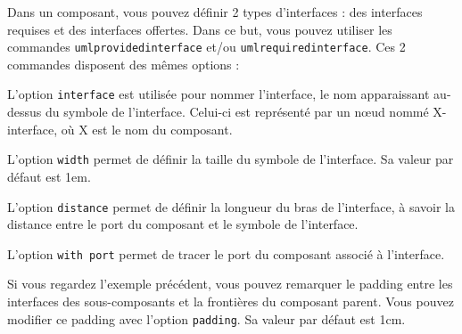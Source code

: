 \documentclass[a4paper,11pt]{report}
\newcommand{\inputTikZ}[1]{%
  }%
\newcommand{\inputTikZ}[1]{%
    \texttt{[image: fig/\#1.pdf]}%
  }%
\begin{document}
Dans un composant, vous pouvez définir 2 types d'interfaces : des interfaces requises et des interfaces offertes. Dans ce but, vous pouvez utiliser les commandes {\tt umlprovidedinterface} et/ou {\tt umlrequiredinterface}.
Ces 2 commandes disposent des mêmes options :

\medskip

\begin{minipage}{0.45\textwidth}

\end{minipage}
\begin{minipage}{0.55\textwidth}
\begin{center}
\inputTikZ{componentinterface}
\end{center}
\end{minipage}

\medskip

L'option {\tt interface} est utilisée pour nommer l'interface, le nom apparaissant au-dessus du symbole de l'interface.
Celui-ci est représenté par un n\oe{}ud nommé X-interface, où X est le nom du composant.

\medskip

L'option {\tt width} permet de définir la taille du symbole de l'interface. Sa valeur par défaut est 1em.

\medskip

L'option {\tt distance} permet de définir la longueur du bras de l'interface, à savoir la distance entre le port du composant et le symbole de l'interface.

\medskip

L'option {\tt with port} permet de tracer le port du composant associé à l'interface.

\medskip

Si vous regardez l'exemple précédent, vous pouvez remarquer le padding entre les interfaces des sous-composants et la frontières du composant parent. Vous pouvez modifier ce padding avec l'option {\tt padding}. Sa valeur par défaut est 1cm. 

\medskip

\begin{minipage}{0.45\textwidth}

\end{minipage}
\begin{minipage}{0.55\textwidth}
\begin{center}
\inputTikZ{componentinterfacepadding}
\end{center}
\end{minipage}
\end{document}
